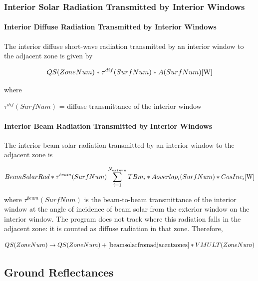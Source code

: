 \subsubsection{Interior Solar Radiation Transmitted by Interior Windows}\label{interior-solar-radiation-transmitted-by-interior-windows}

\paragraph{Interior Diffuse Radiation Transmitted by Interior Windows}\label{interior-diffuse-radiation-transmitted-by-interior-windows}

The interior diffuse short-wave radiation transmitted by an interior window to the adjacent zone is given by

\begin{equation}
QS(ZoneNum)*{\tau ^{dif}}(SurfNum)*A(SurfNum){\rm{    [W]}}
\end{equation}

where

\({\tau ^{dif}}(SurfNum)\) = diffuse transmittance of the interior window

\paragraph{Interior Beam Radiation Transmitted by Interior Windows}\label{interior-beam-radiation-transmitted-by-interior-windows}

The interior beam solar radiation transmitted by an interior window to the adjacent zone is

\begin{equation}
BeamSolarRad*{\tau ^{beam}}(SurfNum)\sum\limits_{i = 1}^{{N_{extwin}}} {TB{m_i}*Aoverla{p_i}(SurfNum)*CosIn{c_i}{\rm{    [W}}]}
\end{equation}

where \({\tau ^{beam}}(SurfNum)\) is the beam-to-beam transmittance of the interior window at the angle of incidence of beam solar from the exterior window on the interior window. The program does not track where this radiation falls in the adjacent zone: it is counted as diffuse radiation in that zone. Therefore,

\begin{equation}
QS(ZoneNum) \to QS(ZoneNum) + [{\rm{beam solar from adjacent zones]}}*VMULT(ZoneNum)
\end{equation}

\subsection{Ground Reflectances}\label{ground-reflectances}

